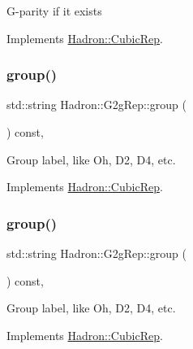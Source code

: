G-\/parity if it exists 

Implements \mbox{\hyperlink{structHadron_1_1CubicRep_a52104e43266d1614c00bbd1c3b395458}{Hadron\+::\+Cubic\+Rep}}.

\mbox{\label{structHadron_1_1G2gRep_a37c28b88ae6f2d60b60465e5cc62126d}} 
\subsubsection{\texorpdfstring{group()}{group()}\hspace{0.1cm}{\footnotesize\ttfamily [1/2]}}
{\footnotesize\ttfamily std\+::string Hadron\+::\+G2g\+Rep\+::group (\begin{DoxyParamCaption}{ }\end{DoxyParamCaption}) const\hspace{0.3cm}{\ttfamily [inline]}, {\ttfamily [virtual]}}

Group label, like Oh, D2, D4, etc. 

Implements \mbox{\hyperlink{structHadron_1_1CubicRep_a0748f11ec87f387062c8e8981339a29c}{Hadron\+::\+Cubic\+Rep}}.

\mbox{\label{structHadron_1_1G2gRep_a37c28b88ae6f2d60b60465e5cc62126d}} 
\subsubsection{\texorpdfstring{group()}{group()}\hspace{0.1cm}{\footnotesize\ttfamily [2/2]}}
{\footnotesize\ttfamily std\+::string Hadron\+::\+G2g\+Rep\+::group (\begin{DoxyParamCaption}{ }\end{DoxyParamCaption}) const\hspace{0.3cm}{\ttfamily [inline]}, {\ttfamily [virtual]}}

Group label, like Oh, D2, D4, etc. 

Implements \mbox{\hyperlink{structHadron_1_1CubicRep_a0748f11ec87f387062c8e8981339a29c}{Hadron\+::\+Cubic\+Rep}}.

\mbox{\label{structHadron_1_1G2gRep_a3a822a30667b3675bf639c78289b9ec8}} 
